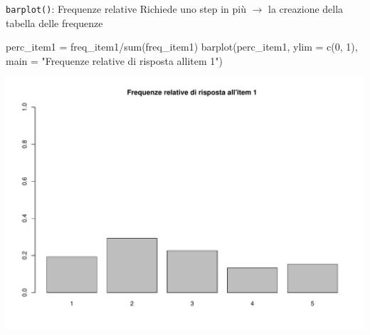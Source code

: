 \documentclass[
  ignorenonframetext,
]{beamer}
\newenvironment{Shaded}{\begin{snugshade}}{\end{snugshade}}
\newcommand{\AttributeTok}[1]{\textcolor[rgb]{0.00,0.34,0.68}{#1}}
\newcommand{\DecValTok}[1]{\textcolor[rgb]{0.69,0.50,0.00}{#1}}
\newcommand{\FunctionTok}[1]{\textcolor[rgb]{0.39,0.29,0.61}{#1}}
\newcommand{\NormalTok}[1]{\textcolor[rgb]{0.12,0.11,0.11}{#1}}
\newcommand{\OtherTok}[1]{\textcolor[rgb]{0.00,0.43,0.16}{#1}}
\newcommand{\SpecialCharTok}[1]{\textcolor[rgb]{0.24,0.68,0.91}{#1}}
\newcommand{\StringTok}[1]{\textcolor[rgb]{0.75,0.01,0.01}{#1}}
\begin{document}
\begin{frame}[fragile]{\texttt{barplot()}: Frequenze relative}
\protect\hypertarget{barplot-frequenze-relative}{}
Richiede uno step in più \(\rightarrow\) la creazione della tabella
delle frequenze

\begin{Shaded}
\begin{Highlighting}[]
\NormalTok{perc\_item1 }\OtherTok{=}\NormalTok{ freq\_item1}\SpecialCharTok{/}\FunctionTok{sum}\NormalTok{(freq\_item1)}
\FunctionTok{barplot}\NormalTok{(perc\_item1, }\AttributeTok{ylim =} \FunctionTok{c}\NormalTok{(}\DecValTok{0}\NormalTok{, }\DecValTok{1}\NormalTok{), }
        \AttributeTok{main =} \StringTok{"Frequenze relative di risposta all\textquotesingle{}item 1"}\NormalTok{)}
\end{Highlighting}
\end{Shaded}

\begin{center}\includegraphics[width=0.7\linewidth]{Practice_files/figure-beamer/unnamed-chunk-51-1} \end{center}
\end{frame}
\end{document}
